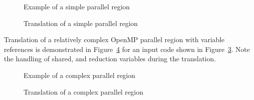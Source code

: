 \lstset{language=C,basicstyle=\scriptsize}
\lstset{language=C,basicstyle=\scriptsize,numbers=left}
\begin{figure}[htbp]
{\indent
  {\mySmallFontSize
    \begin{latexonly}
    
    \end{latexonly}
    \begin{htmlonly}
    
    \end{htmlonly}
  }
}
\caption{Example of a simple parallel region}
\label{Manual:omp:hello1}
\end{figure}

\begin{figure}[htbp]
{\indent
  {\mySmallFontSize
    \begin{latexonly}
    
    \end{latexonly}
    \begin{htmlonly}
    
    \end{htmlonly}
  }
}
\caption{Translation of a simple parallel region}
\label{Manual:omp:hello1-trans}
\end{figure}

Translation of a relatively complex OpenMP parallel region with variable references is demonstrated in
Figure~\ref{Manual:omp:preduction-trans} for an input code shown in
Figure~\ref{Manual:omp:preduction}. 
Note the handling of shared, and reduction variables during the translation.

\lstset{language=C,basicstyle=\scriptsize}
\begin{figure}[htbp]
{\indent
  {\mySmallFontSize
    \begin{latexonly}
    
    \end{latexonly}
    \begin{htmlonly}
    
    \end{htmlonly}
  }
}
\caption{Example of a complex parallel region}
\label{Manual:omp:preduction}
\end{figure}

\begin{figure}[htbp]
{\indent
  {\mySmallFontSize
    \begin{latexonly}
    
    \end{latexonly}
    \begin{htmlonly}
    
    \end{htmlonly}
  }
}
\caption{Translation of a complex parallel region}
\label{Manual:omp:preduction-trans}
\end{figure}

